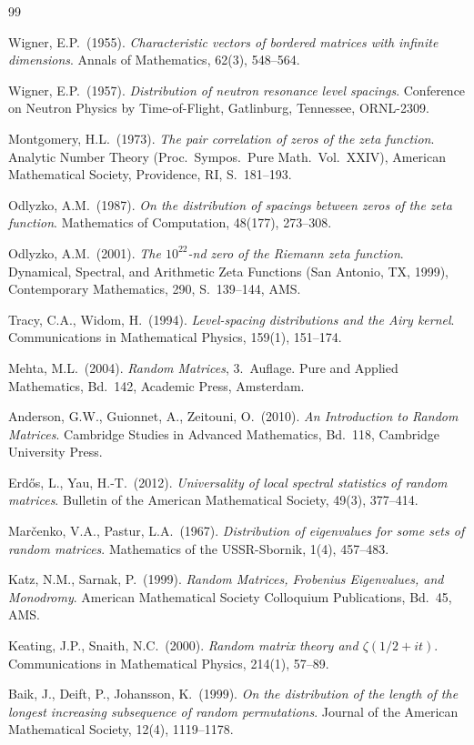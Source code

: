\documentclass[12pt,a4paper]{amsart}
\theoremstyle{definition}
\theoremstyle{remark}
\begin{document}
\begin{thebibliography}{99}

Wigner, E.P.\ (1955).
\textit{Characteristic vectors of bordered matrices with infinite dimensions}.
Annals of Mathematics, 62(3), 548--564.

Wigner, E.P.\ (1957).
\textit{Distribution of neutron resonance level spacings}.
Conference on Neutron Physics by Time-of-Flight, Gatlinburg, Tennessee,
ORNL-2309.

Montgomery, H.L.\ (1973).
\textit{The pair correlation of zeros of the zeta function}.
Analytic Number Theory (Proc.\ Sympos.\ Pure Math.\ Vol.\ XXIV),
American Mathematical Society, Providence, RI, S.\ 181--193.

Odlyzko, A.M.\ (1987).
\textit{On the distribution of spacings between zeros of the zeta function}.
Mathematics of Computation, 48(177), 273--308.

Odlyzko, A.M.\ (2001).
\textit{The $10^{22}$-nd zero of the Riemann zeta function}.
Dynamical, Spectral, and Arithmetic Zeta Functions (San Antonio, TX, 1999),
Contemporary Mathematics, 290, S.\ 139--144, AMS.

Tracy, C.A., Widom, H.\ (1994).
\textit{Level-spacing distributions and the Airy kernel}.
Communications in Mathematical Physics, 159(1), 151--174.

Mehta, M.L.\ (2004).
\textit{Random Matrices}, 3.\ Auflage.
Pure and Applied Mathematics, Bd.\ 142, Academic Press, Amsterdam.

Anderson, G.W., Guionnet, A., Zeitouni, O.\ (2010).
\textit{An Introduction to Random Matrices}.
Cambridge Studies in Advanced Mathematics, Bd.\ 118,
Cambridge University Press.

Erdős, L., Yau, H.-T.\ (2012).
\textit{Universality of local spectral statistics of random matrices}.
Bulletin of the American Mathematical Society, 49(3), 377--414.

Mar\v{c}enko, V.A., Pastur, L.A.\ (1967).
\textit{Distribution of eigenvalues for some sets of random matrices}.
Mathematics of the USSR-Sbornik, 1(4), 457--483.

Katz, N.M., Sarnak, P.\ (1999).
\textit{Random Matrices, Frobenius Eigenvalues, and Monodromy}.
American Mathematical Society Colloquium Publications, Bd.\ 45, AMS.

Keating, J.P., Snaith, N.C.\ (2000).
\textit{Random matrix theory and $\zeta(1/2+it)$}.
Communications in Mathematical Physics, 214(1), 57--89.

Baik, J., Deift, P., Johansson, K.\ (1999).
\textit{On the distribution of the length of the longest increasing subsequence
of random permutations}.
Journal of the American Mathematical Society, 12(4), 1119--1178.

\end{thebibliography}
\end{document}
